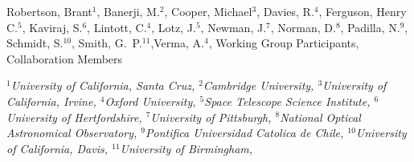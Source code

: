 Robertson, Brant$^{1}$, Banerji, M.$^{2}$, Cooper, Michael$^{3}$, Davies, R.$^{4}$, Ferguson, Henry C.$^{5}$, Kaviraj, S.$^{6}$, Lintott, C.$^{4}$, Lotz, J.$^{5}$, Newman, J.$^{7}$, Norman, D.$^{8}$, Padilla, N.$^{9}$, Schmidt, S.$^{10}$, Smith, G.~P.$^{11}$,Verma, A.$^{4}$, Working Group Participants, Collaboration Members

\vspace*{5mm}

{\centering\it\small
$^{1}$University of California, Santa Cruz,
$^{2}$Cambridge University,
$^{3}$University of California, Irvine,
$^{4}$Oxford University,
$^{5}$Space Telescope Science Institute,
$^{6}$University of Hertfordshire,
$^{7}$University of Pittsburgh,
$^{8}$National Optical Astronomical Observatory,
$^{9}$Pontifica Universidad Catolica de Chile,
$^{10}$University of California, Davis,
$^{11}$University of Birmingham,
}

